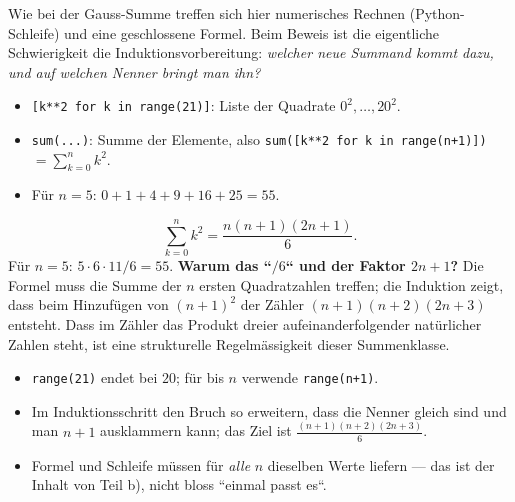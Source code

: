 


Wie bei der Gauss-Summe treffen sich hier numerisches Rechnen (Python-
Schleife) und eine geschlossene Formel. Beim Beweis ist die eigentliche
Schwierigkeit die Induktionsvorbereitung: \emph{welcher neue Summand
kommt dazu, und auf welchen Nenner bringt man ihn?}

\begin{werkzeugkasten}
\begin{itemize}
  \item \texttt{[k**2 for k in range(21)]}: Liste der Quadrate
        $0^2,\dots,20^2$.
  \item \texttt{sum(...)}: Summe der Elemente, also
        \texttt{sum([k**2 for k in range(n+1)])} $=\sum_{k=0}^{n}k^2$.
  \item Für $n=5$: $0+1+4+9+16+25=55$.
\end{itemize}
\end{werkzeugkasten}

\begin{werkzeugkasten}
\begin{equation}
  \sum_{k=0}^{n} k^2=\frac{n(n+1)(2n+1)}6 .
\end{equation}
Für $n=5$: $5\cdot6\cdot11/6=55$. \textbf{Warum das ``$/6$`` und der
Faktor $2n+1$?} Die Formel muss die Summe der $n$ ersten Quadratzahlen
treffen; die Induktion zeigt, dass beim Hinzufügen von $(n+1)^2$ der
Zähler $(n+1)(n+2)(2n+3)$ entsteht. Dass im Zähler das Produkt dreier
aufeinanderfolgender natürlicher Zahlen steht, ist eine strukturelle
Regelmässigkeit dieser Summenklasse.
\end{werkzeugkasten}

\begin{achtung}
\begin{itemize}
  \item \texttt{range(21)} endet bei $20$; für bis $n$ verwende
        \texttt{range(n+1)}.
  \item Im Induktionsschritt den Bruch so erweitern, dass die Nenner gleich
        sind und man $n+1$ ausklammern kann; das Ziel ist
        $\frac{(n+1)(n+2)(2n+3)}6$.
  \item Formel und Schleife müssen für \emph{alle} $n$ dieselben Werte
        liefern --- das ist der Inhalt von Teil b), nicht bloss ``einmal
        passt es``.
\end{itemize}
\end{achtung}
